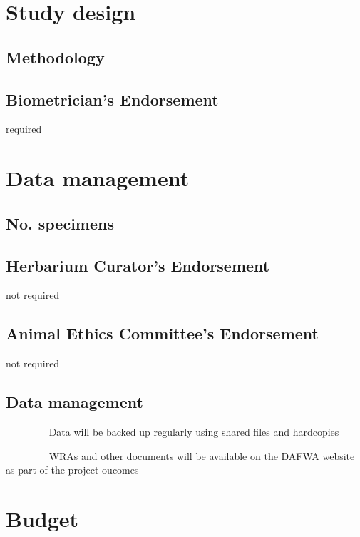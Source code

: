 \documentclass[version=last,
    paper=a4, %
    10pt, %
    usenames,
    dvipsnames,
    oneside, %
    headings=openany, %
    DIV=15 %
]{scrbook}
\begin{document}
\section*{Study design}

\subsection*{Methodology}




\subsection*{Biometrician's Endorsement}
required



\section*{Data management}

\subsection*{No. specimens}




\subsection*{Herbarium Curator's Endorsement}
not required



\subsection*{Animal Ethics Committee's Endorsement}
not required



\subsection*{Data management}
~~~~~~~~ Data will be backed up regularly using shared files and
hardcopies

~~~~~~~~ WRAs and other documents will be available on the DAFWA website
as part of the project oucomes




\section*{Budget}
\end{document}
